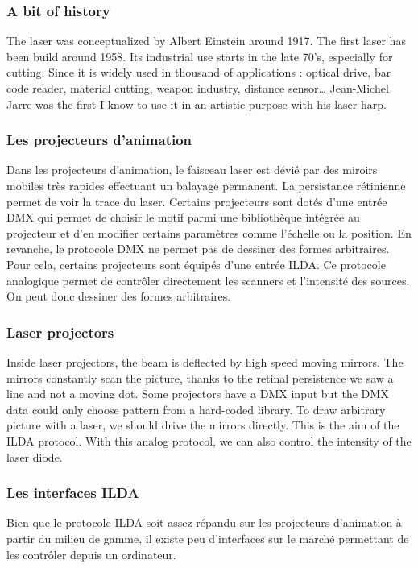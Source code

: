 \begin{en}
\subsubsection{A bit of history}
The laser was conceptualized by Albert Einstein around 1917.
The first laser has been build around 1958.
Its industrial use starts in the late 70's, especially for cutting.
Since it is widely used in thousand of applications : optical drive, bar code reader, material cutting, weapon industry, distance sensor\dots
Jean-Michel Jarre was the first I know to use it in an artistic purpose with his laser harp.
\end{en}

\begin{fr}
\subsubsection{Les projecteurs d'animation}
Dans les projecteurs d'animation, le faisceau laser est dévié par des miroirs mobiles très rapides effectuant un balayage permanent.
La persistance rétinienne permet de voir la trace du laser.
Certains projecteurs sont dotés d'une entrée DMX qui permet de choisir le motif parmi une bibliothèque intégrée au projecteur et d'en modifier certains paramètres comme l'échelle ou la position. En revanche, le protocole DMX ne permet pas de dessiner des formes arbitraires. 
Pour cela, certains projecteurs sont équipés d'une entrée ILDA. 
Ce protocole analogique permet de contrôler directement les scanners et l'intensité des sources. On peut donc dessiner des formes arbitraires.
\end{fr}

\begin{en}
\subsubsection{Laser projectors}
Inside laser projectors, the beam is deflected by high speed moving mirrors.
The mirrors constantly scan the picture, thanks to the retinal persistence we saw a line and not a moving dot.
Some projectors have a DMX input but the DMX data could only choose pattern from a hard-coded library.
To draw arbitrary picture with a laser, we should drive the mirrors directly.
This is the aim of the ILDA protocol.
With this analog protocol, we can also control the intensity of the laser diode.
\end{en}

\begin{fr}
\subsubsection{Les interfaces ILDA}
\label{sec:interfaces_ILDA}
Bien que le protocole ILDA soit assez répandu sur les projecteurs d'animation à partir du milieu de gamme, il existe peu d'interfaces sur le marché permettant de les contrôler depuis un ordinateur.
\end{fr}

